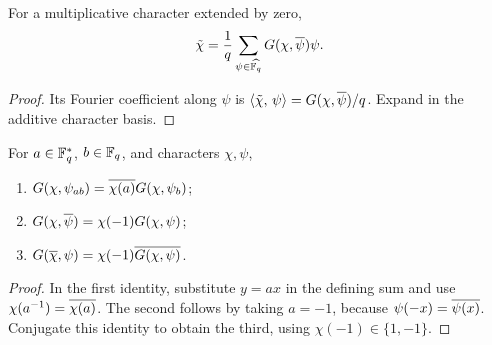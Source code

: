 
\begin{prop}
For a multiplicative character extended by zero,
\[
 \tilde{\chi}=\frac1q\sum_{\psi\in\widehat{\mathbb{F}_q}}G(\chi,\overline{\psi})\psi.
\]
\end{prop}
\begin{proof}
Its Fourier coefficient along $\psi$ is
$\langle \tilde{\chi},\,\psi\rangle=G(\chi,\overline{\psi})/q$. Expand in the additive character basis.
\end{proof}


\begin{prop}
\label{prop-ptes-are-gauss}
For $a\in\mathbb{F}_q^*$, $b\in\mathbb{F}_q$, and characters $\chi,\psi$,
\begin{enumerate}
\item $G(\chi,\psi_{ab})=\overline{\chi(a)}G(\chi,\psi_b)$;
\item $G(\chi,\overline{\psi})=\chi(-1)G(\chi,\psi)$;
\item $G(\overline{\chi},\psi)=\chi(-1)\overline{G(\chi,\psi)}$.
\end{enumerate}
\end{prop}
\begin{proof}
In the first identity, substitute $y=ax$ in the defining sum and use
$\chi(a^{-1})=\overline{\chi(a)}$. The second follows by taking $a=-1$, because
$\psi(-x)=\overline{\psi(x)}$. Conjugate this identity to obtain the third, using
$\chi(-1)\in\{1,-1\}$.
\end{proof}


